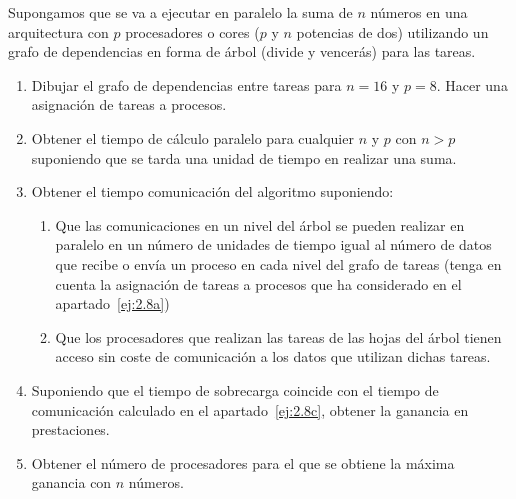 \begin{ejercicio} \label{ej:2.8}
    Supongamos que se va a ejecutar en paralelo la suma de $n$ números en una arquitectura con $p$ procesadores o cores ($p$ y $n$ potencias de dos) utilizando un grafo de dependencias en forma de árbol (divide
    y vencerás) para las tareas.
    \begin{enumerate}
        \item\label{ej:2.8a} Dibujar el grafo de dependencias entre tareas para $n=16$ y $p=8$. Hacer una asignación de tareas
        a procesos.
        \item Obtener el tiempo de cálculo paralelo para cualquier $n$ y $p$ con $n>p$ suponiendo que se tarda una
        unidad de tiempo en realizar una suma.
        \item\label{ej:2.8c} Obtener el tiempo comunicación del algoritmo suponiendo:
        \begin{enumerate}
            \item Que las comunicaciones en un nivel del árbol se pueden realizar en paralelo en un número de unidades de tiempo igual al número de
            datos que recibe o envía un proceso en cada nivel del grafo de tareas (tenga en cuenta la asignación
            de tareas a procesos que ha considerado en el apartado~\ref{ej:2.8a})
            \item Que los procesadores que realizan las tareas de las hojas del árbol tienen acceso sin coste de comunicación a los datos que utilizan
            dichas tareas.
        \end{enumerate}

        \item Suponiendo que el tiempo de sobrecarga coincide con el tiempo de comunicación calculado en el apartado~\ref{ej:2.8c}, obtener la ganancia en prestaciones.
        \item Obtener el número de procesadores para el que se obtiene la máxima ganancia con $n$ números.
    \end{enumerate}


\end{ejercicio}
